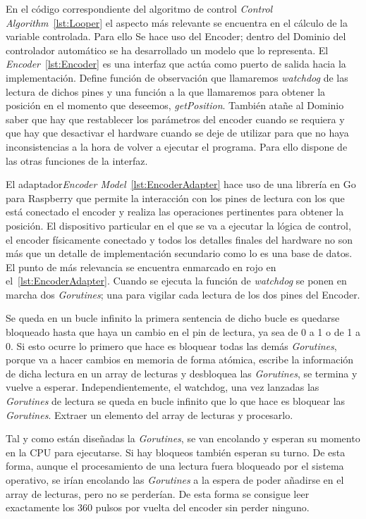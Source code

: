 
En el código correspondiente del algoritmo de control \textit{Control Algorithm}~\cref{lst:Looper} el aspecto más relevante se encuentra en el cálculo de la variable controlada.
Para ello Se hace uso del Encoder; dentro del Dominio del controlador automático se ha desarrollado un modelo que lo representa.
El \textit{Encoder}~\cref{lst:Encoder} es una interfaz que actúa como puerto de salida hacia la implementación.
Define función de observación que llamaremos \textit{watchdog} de las lectura de dichos pines y una función a la que llamaremos para obtener la posición en el momento que deseemos, \textit{getPosition}.
También atañe al Dominio saber que hay que restablecer los parámetros del encoder cuando se requiera y que hay que desactivar el hardware cuando se deje de utilizar para que no haya inconsistencias a la hora de volver a ejecutar el programa.
Para ello dispone de las otras funciones de la interfaz.

El adaptador\textit{Encoder Model}~\cref{lst:EncoderAdapter} hace uso de una librería en Go para Raspberry que permite la interacción con los pines de lectura con los que está conectado el encoder y realiza las operaciones pertinentes para obtener la posición.
El dispositivo particular en el que se va a ejecutar la lógica de control, el encoder físicamente conectado y todos los detalles finales del hardware no son más que un detalle de implementación secundario como lo es una base de datos.
El punto de más relevancia se encuentra enmarcado en rojo en el~\cref{lst:EncoderAdapter}.
Cuando se ejecuta la función de \textit{watchdog} se ponen en marcha dos \textit{Gorutines}; una para vigilar cada lectura de los dos pines del Encoder.

Se queda en un bucle infinito la primera sentencia de dicho bucle es quedarse bloqueado hasta que haya un cambio en el pin de lectura, ya sea de 0 a 1 o de 1 a 0.
Si esto ocurre lo primero que hace es bloquear todas las demás \textit{Gorutines}, porque va a hacer cambios en memoria de forma atómica, escribe la información de dicha lectura en un array de lecturas y desbloquea las \textit{Gorutines}, se termina y vuelve a esperar.
Independientemente, el watchdog, una vez lanzadas las \textit{Gorutines} de lectura se queda en bucle infinito que lo que hace es bloquear las \textit{Gorutines}.
Extraer un elemento del array de lecturas y procesarlo.

Tal y como están diseñadas la \textit{Gorutines}, se van encolando y esperan su momento en la CPU para ejecutarse.
Si hay bloqueos también esperan su turno.
De esta forma, aunque el procesamiento de una lectura fuera bloqueado por el sistema operativo, se irían encolando las \textit{Gorutines} a la espera de poder añadirse en el array de lecturas, pero no se perderían.
De esta forma se consigue leer exactamente los 360 pulsos por vuelta del encoder sin perder ninguno.



